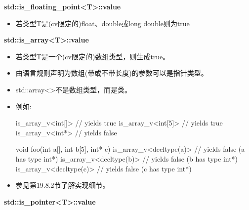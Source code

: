 \textbf{std::is\_floating\_point<T>::value}

\begin{itemize}
\item 
若类型T是(cv限定的)float、double或long double则为true
\end{itemize}

\textbf{std::is\_array<T>::value}

\begin{itemize}
\item 
若类型T是一个(cv限定的)数组类型，则生成true。

\item 
由语言规则声明为数组(带或不带长度)的参数可以是指针类型。

\item 
std::array<>不是数组类型，而是类。

\item 
例如:

\begin{cpp}
is_array_v<int[]> // yields true
is_array_v<int[5]> // yields true
is_array_v<int*> // yields false

void foo(int a[], int b[5], int* c)
{
	is_array_v<decltype(a)> // yields false (a has type int*)
	is_array_v<decltype(b)> // yields false (b has type int*)
	is_array_v<decltype(c)> // yields false (c has type int*)
}
\end{cpp}

\item 
参见第19.8.2节了解实现细节。
\end{itemize}

\textbf{std::is\_pointer<T>::value}

